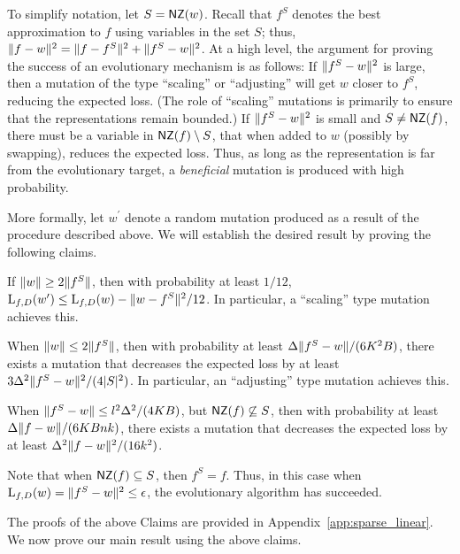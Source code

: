 To simplify notation, let $S = \mathsf{NZ}(w)$. Recall that $f^S$ denotes the best
approximation to $f$ using variables in the set $S$; thus, $\Vert f - w \Vert^2 =
\Vert f - f^S \Vert^2 + \Vert f^S - w \Vert^2$. At a high level, the argument for
proving the success of an evolutionary mechanism is as follows: If
$\Vert f^S - w \Vert^2$ is large, then a mutation of the type ``scaling'' or
``adjusting'' will get $w$ closer to $f^S$, reducing the expected loss. (The
role of ``scaling'' mutations is primarily to ensure that the representations
remain bounded.) If $\Vert f^S - w \Vert^2$ is small and $S \neq \mathsf{NZ}(f)$, there
must be a variable in $\mathsf{NZ}(f) \setminus S$, that when added to $w$ (possibly by
swapping), reduces the expected loss. Thus, as long as the representation is far
from the evolutionary target, a \emph{beneficial} mutation is produced with high
probability.

More formally, let $w^\prime$ denote a random mutation produced as a result of
the procedure described above.  We will establish the desired result by proving
the following claims.
\begin{claim} \label{claim:apple} If $\Vert w \Vert \geq 2 \Vert f^S \Vert$, then
with probability at least $1/12$, $\mathrm{L}_{f, D}(w^\prime) \leq \mathrm{L}_{f, D}(w) -
\Vert w - f^S \Vert^2/12$. In particular, a ``scaling'' type mutation achieves
this. \end{claim}
\begin{claim} \label{claim:banana} When $\Vert w \Vert \leq 2 \Vert f^S \Vert$,
then with probability at least $\Delta \Vert f^S - w \Vert/(6K^2 B)$, there
exists a mutation that decreases the expected loss by at least $3
\Delta^2\Vert f^S - w \Vert^2/(4|S|^2)$. In particular, an ``adjusting'' type
mutation achieves this. \end{claim}
\begin{claim} \label{claim:cantaloupe} When $\Vert f^S - w \Vert \leq
l^2\Delta^2/(4KB)$, but $\mathsf{NZ}(f) \not\subseteq S$, then with probability
at least $\Delta \Vert f - w \Vert/(6KBnk)$, there exists a mutation that
decreases the expected loss by at least $\Delta^2 \Vert f-w \Vert^2/(16k^2)$.
\end{claim}

\noindent Note that when $\mathsf{NZ}(f) \subseteq S$, then $f^S = f$. Thus, in this case
when $\mathrm{L}_{f, D}(w) = \Vert f^S - w \Vert^2 \leq \epsilon$, the evolutionary
algorithm has succeeded. \medskip 

The proofs of the above Claims are provided in
Appendix~\ref{app:sparse_linear}. We now prove our main result using the
above claims.
% 


